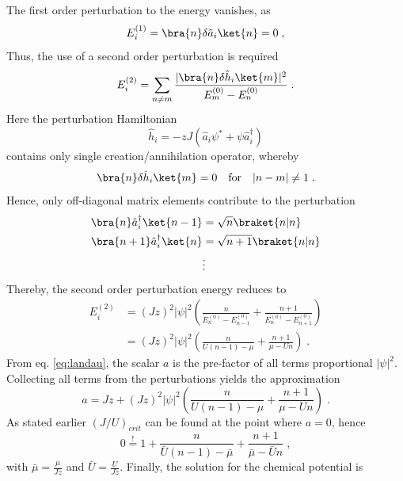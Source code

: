 The first order perturbation to the energy vanishes, as
\begin{equation}
	E_{i}^{(1)} = \bra{n} \delta \hat{a}_i \ket{n} = 0 \; ,
\end{equation}
Thus, the use of a second order perturbation is required
\begin{equation}
	E_{i}^{(2)} = \sum_{n \neq m} \frac{|\bra{n} \delta \hat{h}_i \ket{m}|^2}{E_{m}^{(0)} - E_{n}^{(0)}} \; .
\end{equation}
Here the perturbation Hamiltonian
\begin{equation}
	\hat{h}_i = - z J \left( \hat{a}_i \psi^* + \psi \hat{a}_{i}^{\dag} \right)
\end{equation}
contains only single creation/annihilation operator, whereby
\begin{equation}
	\bra{n} \delta \hat{h}_i \ket{m} = 0 \quad \text{for} \quad |n - m| \neq 1 \; .
\end{equation}
Hence, only off-diagonal matrix elements contribute to the perturbation
\begin{align*}
	\bra{n}  \hat{a}_{i}^{\dag} \ket{n-1} &= \sqrt{n} \braket{n|n} \\
	\bra{n+1}  \hat{a}_{i}^{\dag} \ket{n} &= \sqrt{n+1} \braket{n|n} \\
	& \vdots
\end{align*}
Thereby, the second order perturbation energy reduces to
\begin{align}
	E_{i}^{(2)} &= \left( J z \right)^2 |\psi|^2 \left( \frac{n}{E_{n}^{(0)}- E_{n-1}^{(0)}} +  \frac{n+1}{E_{n}^{(0)}- E_{n+1}^{(0)}} \right) \nonumber \\
	&= \left( J z \right)^2 |\psi|^2 \left( \frac{n}{U(n-1) - \mu} + \frac{n+1}{\mu - U n} \right) \; .
\end{align}
From eq. \eqref{eq:landau}, the scalar $a$ is the pre-factor of all terms proportional $|\psi|^2$. Collecting all terms from the perturbations yields the approximation 
\begin{equation}
	a = J z + \left( J z \right)^2 |\psi|^2 \left( \frac{n}{U(n-1) - \mu} + \frac{n+1}{\mu - U n} \right) \; .
\end{equation} 
As stated earlier $(J/U)_{crit}$ can be found at the point where $a = 0$, hence
\begin{equation}
	0 \overset{!}{=} 1 + \frac{n}{\bar{U} (n-1) - \bar{\mu}} + \frac{n+1}{\bar{\mu} - \bar{U} n} \; ,
\end{equation}
with $\bar{\mu} = \frac{\mu}{J z}$ and $\bar{U} = \frac{U}{J z}$. Finally, the solution for the chemical potential is \cite{vanoosten}

